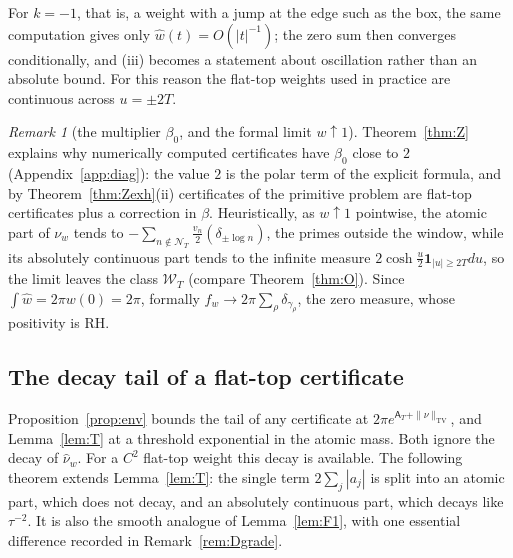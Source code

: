 \documentclass[11pt]{amsart}
\theoremstyle{definition}
\theoremstyle{remark}
\newtheorem{remark}[theorem]{Remark}
\newcommand{\TV}{\operatorname{TV}}
\newcommand{\nuh}{\widehat\nu}
\newcommand{\wh}{\widehat w}
\newcommand{\Wcl}{\mathcal W_T}
\newcommand{\NT}{\mathcal N_T}
\newcommand{\Aconst}{\mathsf A_T}
\begin{document}
For $k=-1$, that is, a weight with a jump at the edge such as the box, the same computation gives
only $\wh(t)=O(|t|^{-1})$; the zero sum then converges conditionally, and (iii) becomes a statement
about oscillation rather than an absolute bound. For this reason the flat-top weights used in
practice are continuous across $u=\pm2T$.

\begin{remark}[the multiplier $\beta_0$, and the formal limit $w\uparrow1$]\label{rem:RHcert}
Theorem~\ref{thm:Z} explains why numerically computed certificates have $\beta_0$ close to $2$
(Appendix~\ref{app:diag}): the value $2$ is the polar term of the explicit formula, and by
Theorem~\ref{thm:Zexh}(ii) certificates of the primitive problem are flat-top certificates plus a
correction in $\beta$. Heuristically, as $w\uparrow1$ pointwise, the atomic part of $\nu_w$ tends to
$-\sum_{n\notin\NT}\frac{v_n}2(\delta_{\pm\log n})$, the primes outside the window, while its
absolutely continuous part tends to the infinite measure $2\cosh\frac u2\mathbf 1_{|u|\ge2T}du$, so
the limit leaves the class $\Wcl$ (compare Theorem~\ref{thm:O}). Since $\int\wh=2\pi w(0)=2\pi$,
formally $f_w\to2\pi\sum_\rho\delta_{\gamma_\rho}$, the zero measure, whose positivity is RH.
\end{remark}


\subsection{The decay tail of a flat-top certificate}

Proposition~\ref{prop:env} bounds the tail of any certificate at $2\pi e^{\Aconst+\|\nu\|_{\TV}}$,
and Lemma~\ref{lem:T} at a threshold exponential in the atomic mass. Both ignore the decay of
$\nuh_w$. For a $C^2$ flat-top weight this decay is available. The following theorem extends
Lemma~\ref{lem:T}: the single term $2\sum_j|a_j|$ is split into an atomic part, which does not decay,
and an absolutely continuous part, which decays like $\tau^{-2}$. It is also the smooth analogue of
Lemma~\ref{lem:F1}, with one essential difference recorded in Remark~\ref{rem:Dgrade}.
\end{document}
